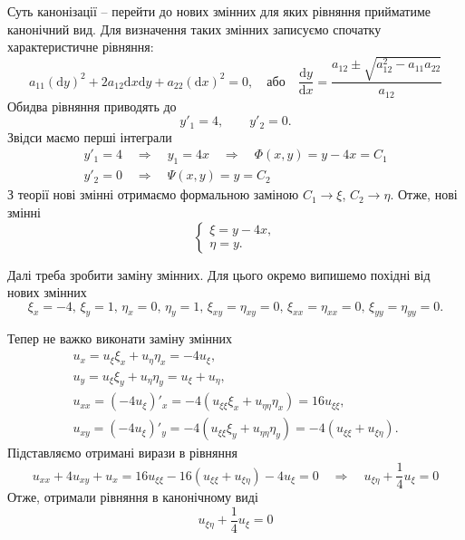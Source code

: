 Суть канонізації -- перейти до нових змінних для яких рівняння прийматиме канонічний вид. Для визначення таких змінних записуємо  спочатку характеристичне рівняння:
\begin{equation}
    a_{11} (\mathrm{d}y)^2 + 2a_{12} \mathrm{d}x\mathrm{d}y + a_{22} (\mathrm{d}x)^2 = 0, \quad \text{або} \quad \frac{\mathrm{d}y}{\mathrm{d}x} = \frac{a_{12} \pm \sqrt{a_{12}^2 - a_{11}a_{22}}}{a_{12}}
\end{equation}
Обидва рівняння приводять до 
\begin{equation}
    y'_1 = 4, \qquad y'_2 = 0.
\end{equation}
Звідси маємо перші інтеграли
\begin{equation}
    \begin{gathered}
        y'_1 = 4 
        \quad\Rightarrow\quad
        y_1 = 4x
        \quad\Rightarrow\quad
        \Phi(x,y) = y - 4x = C_1\\
        y'_2 = 0 
        \quad\Rightarrow\quad
        \Psi(x,y) = y = C_2
    \end{gathered}
\end{equation}
З теорії нові змінні отримаємо формальною заміною $C_1 \to \xi$, $C_2 \to \eta$. Отже, нові змінні
\begin{equation}
    \left\{ \begin{aligned}
        \xi = y - 4x,\\
        \eta = y.
    \end{aligned} \right.
\end{equation}

Далі треба зробити заміну змінних. Для цього окремо випишемо похідні від нових змінних
\begin{equation*}
    \xi_x = -4,\, \xi_y = 1,\, \eta_x = 0,\, \eta_y = 1,\, \xi_{xy} = \eta_{xy} = 0,\, \xi_{xx} = \eta_{xx} = 0,\, \xi_{yy} = \eta_{yy} = 0.
\end{equation*}  

Тепер не важко виконати заміну змінних 
\begin{equation*}
    \begin{gathered}
        u_x = u_\xi \xi_x + u_\eta \eta_x = -4 u_\xi,\\
        u_y = u_\xi \xi_y + u_\eta \eta_y = u_\xi + u_\eta,\\
        u_{xx} = (-4 u_\xi)'_x = -4(u_{\xi\xi} \xi_x + u_{\eta\eta} \eta_x) = 16 u_{\xi\xi},\\
        u_{xy} = (-4 u_\xi)'_y = -4(u_{\xi\xi} \xi_y + u_{\eta\eta} \eta_y) = -4(u_{\xi\xi} + u_{\xi\eta}).
    \end{gathered}
\end{equation*}
Підставляємо отримані вирази в рівняння 
\begin{equation*}
    u_{xx} + 4u_{xy} + u_x = 16 u_{\xi\xi} - 16(u_{\xi\xi} + u_{\xi\eta}) - 4u_\xi = 0
    \quad\Rightarrow\quad
    u_{\xi\eta} + \frac{1}{4}u_\xi = 0
\end{equation*}
Отже, отримали рівняння в канонічному виді
\begin{equation}
    u_{\xi\eta} + \frac{1}{4}u_\xi = 0
\end{equation}

